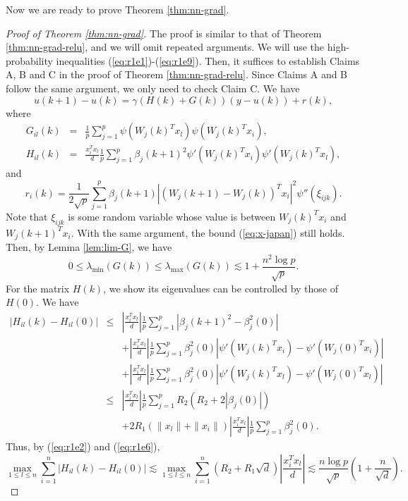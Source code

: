Now we are ready to prove Theorem \ref{thm:nn-grad}.
\begin{proof}[Proof of Theorem \ref{thm:nn-grad}]
The proof is similar to that of Theorem \ref{thm:nn-grad-relu}, and we will omit repeated arguments. We will use the high-probability inequalities (\ref{eq:r1e1})-(\ref{eq:r1e9}). Then, it suffices to establish Claims A, B and C in the proof of Theorem \ref{thm:nn-grad-relu}. Since Claims A and B follow the same argument, we only need to check Claim C. We have
\begin{equation}
u(k+1)-u(k)=\gamma(H(k)+G(k))(y-u(k))+r(k), \label{eq:iter-u-arctan}
\end{equation}
where
\begin{eqnarray*}
G_{il}(k) &=& \frac{1}{p}\sum_{j=1}^p\psi(W_j(k)^Tx_l)\psi(W_j(k)^Tx_i), \\
H_{il}(k) &=& \frac{x_i^Tx_l}{d}\frac{1}{p}\sum_{j=1}^p\beta_j(k+1)^2\psi'(W_j(k)^Tx_i)\psi'(W_j(k)^Tx_l),
\end{eqnarray*}
and
$$r_i(k)=\frac{1}{2\sqrt{p}}\sum_{j=1}^p\beta_j(k+1)|(W_j(k+1)-W_j(k))^Tx_i|^2\psi''(\xi_{ijk}).$$
Note that $\xi_{ijk}$ is some random variable whose value is between $W_j(k)^Tx_i$ and $W_j(k+1)^Tx_i$. With the same argument, the bound (\ref{eq:x-japan}) still holds. Then, by Lemma \ref{lem:lim-G}, we have
\begin{equation}
0 \leq \lambda_{\min}(G(k)) \leq \lambda_{\max}(G(k)) \lesssim 1+\frac{n^2\log p}{\sqrt{p}}. \label{eq:Gk-spec-arctan}
\end{equation}
For the matrix $H(k)$, we show its eigenvalues can be controlled by those of $H(0)$. We have
\begin{eqnarray*}
|H_{il}(k)-H_{il}(0)| &\leq& \left|\frac{x_i^Tx_l}{d}\right|\frac{1}{p}\sum_{j=1}^p|\beta_j(k+1)^2-\beta_j^2(0)| \\
&& + \left|\frac{x_i^Tx_l}{d}\right|\frac{1}{p}\sum_{j=1}^p\beta_j^2(0)|\psi'(W_j(k)^Tx_i) - \psi'(W_j(0)^Tx_i)| \\
&& + \left|\frac{x_i^Tx_l}{d}\right|\frac{1}{p}\sum_{j=1}^p\beta_j^2(0)|\psi'(W_j(k)^Tx_l) - \psi'(W_j(0)^Tx_l)| \\
&\leq& \left|\frac{x_i^Tx_l}{d}\right|\frac{1}{p}\sum_{j=1}^pR_2(R_2+2|\beta_j(0)|) \\
&& + 2R_1\left(\|x_l\| + \|x_i\|\right)\left|\frac{x_i^Tx_l}{d}\right|\frac{1}{p}\sum_{j=1}^p\beta_j^2(0).
\end{eqnarray*}
Thus, by (\ref{eq:r1e2}) and (\ref{eq:r1e6}),
$$\max_{1\leq l\leq n}\sum_{i=1}^n|H_{il}(k) - H_{il}(0)|\lesssim \max_{1\leq l\leq n}\sum_{i=1}^n(R_2+R_1\sqrt{d})\left|\frac{x_i^Tx_l}{d}\right|\lesssim \frac{n\log p}{\sqrt{p}}\left(1+\frac{n}{\sqrt{d}}\right).$$

\end{proof}
